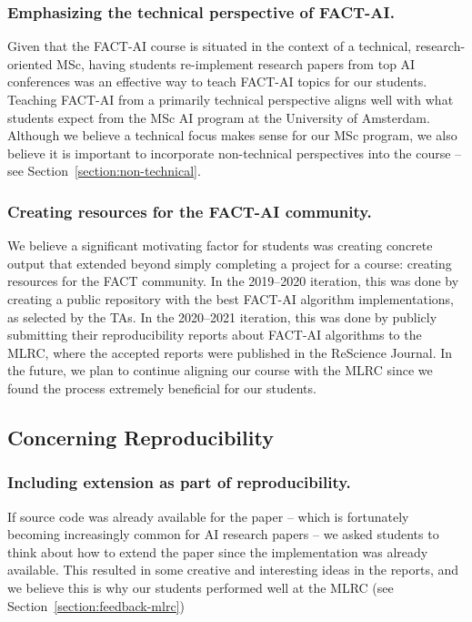 \documentclass[letterpaper]{article}
\newcommand{\OurUniversity}{the University of Amsterdam}
\begin{document}
\subsubsection{Emphasizing the technical perspective of FACT-AI.}
Given that the FACT-AI course is situated in the context of a technical, research-oriented MSc, having students re-implement research papers from top AI conferences was an effective way to teach FACT-AI topics for our students. 
Teaching FACT-AI from a primarily technical perspective 
aligns well with what students expect from the MSc AI program at \OurUniversity{}.
Although we believe a technical focus makes sense for our MSc program, we also believe it is important to incorporate non-technical perspectives into the course -- see Section~\ref{section:non-technical}. 

\subsubsection{Creating resources for the FACT-AI community.}
We believe a significant motivating factor for students was creating concrete output that extended beyond simply completing a project for a course: creating resources for the FACT community. 
In the 2019--2020 iteration, this was done by creating a public repository with the best FACT-AI algorithm implementations, as selected by the TAs. 
In the 2020--2021 iteration, this was done by publicly submitting their reproducibility reports about FACT-AI algorithms to the MLRC, where the accepted reports were published in the ReScience Journal. 
In the future, we plan to continue aligning our course with the MLRC since we found the process extremely beneficial for our students. 


\subsection{Concerning Reproducibility}

\subsubsection{Including extension as part of reproducibility.}
If source code was already available for the paper -- which is fortunately becoming increasingly common for AI research papers -- we asked students to think about how to extend the paper since the implementation was already available. This resulted in some creative and interesting ideas in the reports, and we believe this is why our students performed well at the MLRC (see Section~\ref{section:feedback-mlrc})
\end{document}
